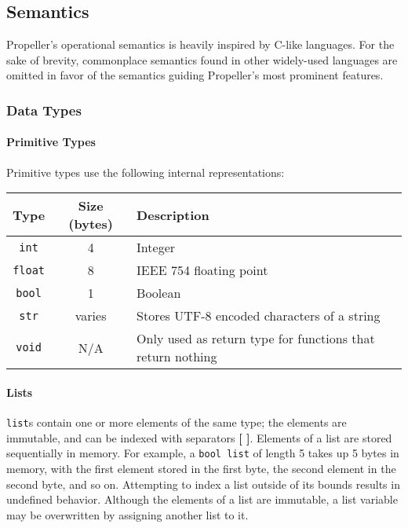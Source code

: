 \subsection{Semantics}

Propeller's operational semantics is heavily inspired by C-like languages. For the sake of
brevity, commonplace semantics found in other widely-used languages are omitted in
favor of the semantics guiding Propeller's most prominent features.

\subsubsection{Data Types}

\paragraph{Primitive Types}
Primitive types use the following internal representations:
\begin{center}
\begin{tabular}{| c | c | p{8cm} | }
\hline
 \textbf{Type} & \textbf{Size (bytes)} & \textbf{Description} \\
 \hline
 \texttt{int} & 4 & Integer \\
 \hline
 \texttt{float} & 8 & IEEE 754 floating point \\
 \hline
 \texttt{bool} & 1 & Boolean \\
 \hline
 \texttt{str} & varies & Stores UTF-8 encoded characters of a
 string \\
 \hline
 \texttt{void} & N/A & Only used as return type for functions that return nothing \\
\hline
\end{tabular}
\end{center}

\paragraph{Lists}
\texttt{list}s contain one or more elements of the same type; the elements are immutable, and can be
indexed with separators \textbf{[ ]}. Elements of a list are stored sequentially in memory.
For example, a \texttt{bool list} of length 5 takes up 5 bytes in memory, with the first element
stored in the first byte, the second element in the second byte, and so on. Attempting to index
a list outside of its bounds results in undefined behavior. Although the elements of a list are
immutable, a list variable may be overwritten by assigning another list to it.

